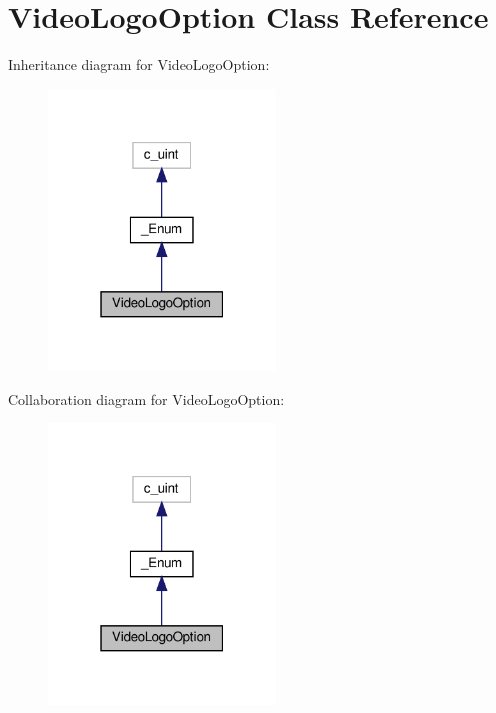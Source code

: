 \hypertarget{classvlc_1_1_video_logo_option}{}\section{Video\+Logo\+Option Class Reference}
\label{classvlc_1_1_video_logo_option}


Inheritance diagram for Video\+Logo\+Option\+:
\nopagebreak
\begin{figure}[H]
\begin{center}
\leavevmode
\includegraphics[width=171pt]{classvlc_1_1_video_logo_option__inherit__graph}
\end{center}
\end{figure}


Collaboration diagram for Video\+Logo\+Option\+:
\nopagebreak
\begin{figure}[H]
\begin{center}
\leavevmode
\includegraphics[width=171pt]{classvlc_1_1_video_logo_option__coll__graph}
\end{center}
\end{figure}
